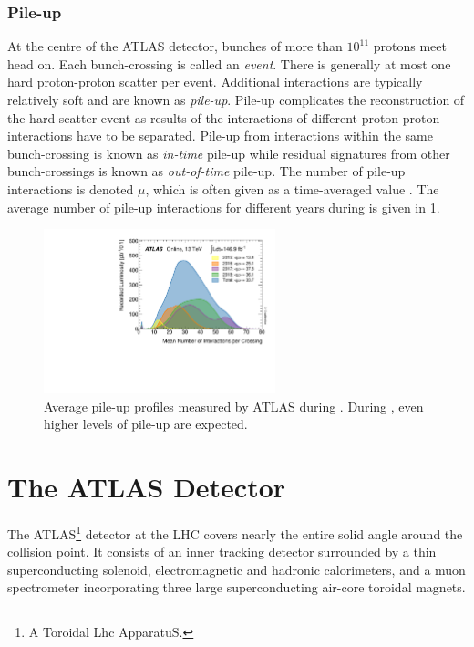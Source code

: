 \subsubsection{Pile-up}

At the centre of the ATLAS detector, bunches of more than $10^{11}$ protons meet head on.
Each bunch-crossing is called an \textit{event}.
There is generally at most one hard proton-proton scatter per event.
Additional interactions are typically relatively soft and are known as \textit{pile-up}.
Pile-up complicates the reconstruction of the hard scatter event as results of the interactions of different proton-proton interactions have to be separated.
Pile-up from interactions within the same bunch-crossing is known as \textit{in-time} pile-up while residual signatures from other bunch-crossings is known as \textit{out-of-time} pile-up.
The number of pile-up interactions is denoted $\mu$, which is often given as a time-averaged value \angles{\mu}.
The average number of pile-up interactions for different years during \runtwo is given in \cref{fig:run2_pile-up}.
%
\begin{figure}[!htbp]
  \centering
  \includegraphics[width=0.6\textwidth]{chapters/2.detector/figs/mu_2015_2018.pdf}
  \caption{
    Average pile-up profiles measured by ATLAS during \runtwo \cite{atlas-lumi-run2}.
    During \runthree, even higher levels of pile-up are expected.
  }
  \label{fig:run2_pile-up}
\end{figure}
%


\section{The ATLAS Detector}\label{sec:atlas_detector}

The ATLAS\footnote{A Toroidal Lhc ApparatuS.} detector at the LHC covers nearly the entire solid angle around the collision point.
It consists of an inner tracking detector surrounded by a thin superconducting solenoid, electromagnetic and hadronic calorimeters,
and a muon spectrometer incorporating three large superconducting air-core toroidal magnets.

